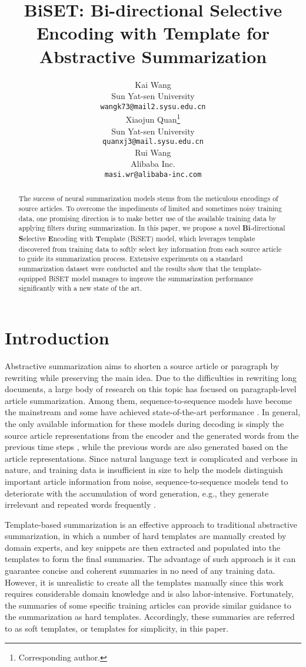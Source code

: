 \documentclass[11pt,a4paper]{article}
\title{BiSET: Bi-directional Selective Encoding with Template for Abstractive Summarization}
\author{Kai Wang \\
  Sun Yat-sen University \\
  \texttt{\small wangk73@mail2.sysu.edu.cn} \\\And
  Xiaojun Quan\thanks{ \hspace*{0.15cm}Corresponding author.} \\
  Sun Yat-sen University \\
  \texttt{\small quanxj3@mail.sysu.edu.cn} \\\And
  Rui Wang \\
  Alibaba Inc.\\
  \texttt{\small masi.wr@alibaba-inc.com} \\}
\date{}
\begin{document}
\maketitle
\begin{abstract}
The success of neural summarization models stems from the meticulous encodings of source articles. To overcome the impediments of limited and sometimes noisy training data, one promising direction is to make better use of the available training data by applying filters during summarization. In this paper, we propose a novel \textbf{Bi}-directional \textbf{S}elective \textbf{E}ncoding with \textbf{T}emplate (BiSET) model, which leverages template discovered from training data to softly select key information from each source article to guide its summarization process. Extensive experiments on a standard summarization dataset were conducted and the results show that the template-equipped BiSET model manages to improve the summarization performance significantly with a new state of the art.
\end{abstract}

\section{Introduction}
Abstractive summarization aims to shorten a source article or paragraph by rewriting while preserving the main idea. Due to the difficulties in rewriting long documents, a large body of research on this topic has focused on paragraph-level article summarization. Among them, sequence-to-sequence models have become the mainstream and some have achieved state-of-the-art performance \cite{Rush2015A,Chopra2016Abstractive,Nallapati2016Abstractive}. In general, the only available information for these models during decoding is simply the source article representations from the encoder and the generated words from the previous time steps \cite{Nallapati2016Abstractive,Gu2016Incorporating,Lin2018Global}, while the previous words are also generated based on the article representations. Since natural language text is complicated and verbose in nature, and training data is insufficient in size to help the models distinguish important article information from noise, sequence-to-sequence models tend to deteriorate with the accumulation of word generation, e.g., they generate irrelevant and repeated words frequently \cite{koehn2017six}.

Template-based summarization \cite{zhou2004template} is an effective approach to traditional abstractive summarization, in which a number of hard templates are manually created by domain experts, and key snippets are then extracted and populated into the templates to form the final summaries. The advantage of such approach is it can guarantee concise and coherent summaries in no need of any training data. However, it is unrealistic to create all the templates manually since this work requires considerable domain knowledge and is also labor-intensive. Fortunately, the summaries of some specific training articles can provide similar guidance to the summarization as hard templates. Accordingly, these summaries are referred to as soft templates, or templates for simplicity, in this paper.
\end{document}
